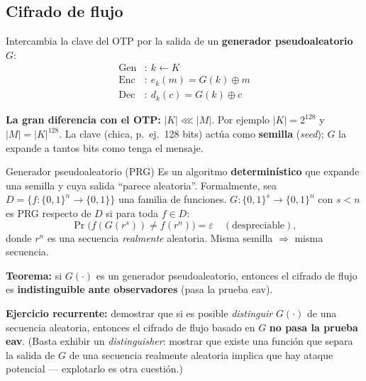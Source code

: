 \documentclass[../main.tex]{subfiles}
\begin{document}
\subsection{Cifrado de flujo}

Intercambia la clave del OTP por la salida de un \textbf{generador
pseudoaleatorio} $G$:
\begin{align*}
\text{Gen}&:\ k \leftarrow K\\
\text{Enc}&:\ e_k(m) = G(k) \oplus m\\
\text{Dec}&:\ d_k(c) = G(k) \oplus c
\end{align*}

\begin{destacado}
\textbf{La gran diferencia con el OTP:} $|K| \lll |M|$. Por ejemplo
$|K|=2^{128}$ y $|M|=|K|^{128}$. La clave (chica, p.\ ej.\ 128 bits) actúa como
\textbf{semilla} (\emph{seed}); $G$ la expande a tantos bits como tenga el
mensaje.
\end{destacado}

\begin{definicion}{Generador pseudoaleatorio (PRG)}
Es un algoritmo \textbf{determinístico} que expande una semilla y cuya salida
``parece aleatoria''. Formalmente, sea $D=\{f:\{0,1\}^n\to\{0,1\}\}$ una familia
de funciones. $G:\{0,1\}^s\to\{0,1\}^n$ con $s<n$ es PRG respecto de $D$ si para
toda $f\in D$:
$$\Pr\big(f(G(r^s)) \neq f(r^n)\big) = \varepsilon \quad(\text{despreciable}),$$
donde $r^n$ es una secuencia \emph{realmente} aleatoria. Misma semilla
$\Rightarrow$ misma secuencia.
\end{definicion}

\begin{destacado}
\textbf{Teorema:} si $G(\cdot)$ es un generador pseudoaleatorio, entonces el
cifrado de flujo es \textbf{indistinguible ante observadores} (pasa la prueba
eav).
\end{destacado}

\begin{examen}
\textbf{Ejercicio recurrente:} demostrar que si es posible \emph{distinguir}
$G(\cdot)$ de una secuencia aleatoria, entonces el cifrado de flujo basado en
$G$ \textbf{no pasa la prueba eav}. (Basta exhibir un \emph{distinguisher}:
mostrar que existe una función que separa la salida de $G$ de una secuencia
realmente aleatoria implica que hay ataque potencial — explotarlo es otra
cuestión.)
\end{examen}
\end{document}
